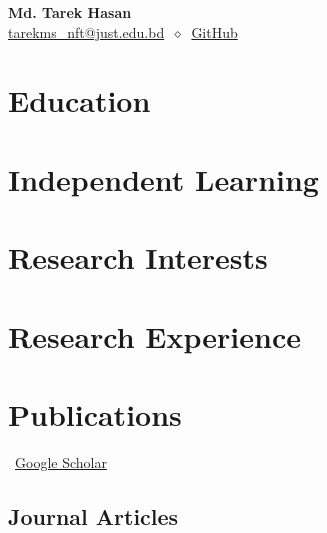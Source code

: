 \documentclass[11pt]{article} %
\makeatletter
\newcommand{\mytitle}[4]{
  \begin{center}
    \Huge\textbf{Md. Tarek Hasan}\normalsize \\ %
    \href{mailto:tarekms_nft@just.edu.bd}{tarekms\_nft@just.edu.bd}
    $\ \diamond\ $
  \href{https://github.com/tareknowshin}{GitHub}
  \end{center}
}
\makeatother
\begin{document}
\mytitle{Your Name}{person@gmail.com}{yourwebsite.com}{Your Address\\Goes here\\This field can be excluded} %


\RaggedRight

\section*{Education}


\section*{Independent Learning}
\label{independent_study}


\section*{Research Interests}
\label{research_interest}



\section*{Research Experience}
\label{exp_research}



\section*{Publications}
\label{pubs}

\vspace{-.75em}
\small
\faGoogle~\href{https://scholar.google.com/citations?user=6kRtk-IAAAAJ&hl=en}{Google Scholar}\\
\normalsize

\subsection*{Journal Articles}
\label{journal-article}
\newrefcontext[labelprefix=J] %
\nocite{*} %
\printbibliography[
    type=article, %
    heading=none, %
    resetnumbers=true, %
    keyword=J %
]
\end{document}
